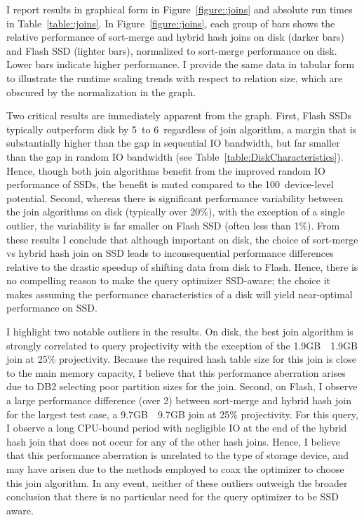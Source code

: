 I report results in graphical form in Figure~\ref{figure::joins} and absolute run times in Table~\ref{table::joins}.
In Figure~\ref{figure::joins}, each group of bars shows the relative performance of sort-merge and hybrid hash joins on disk (darker bars) and Flash SSD (lighter bars), normalized to sort-merge performance on disk.
Lower bars indicate higher performance.
I provide the same data in tabular form to illustrate the runtime scaling trends with respect to relation size, which are obscured by the normalization in the graph.

Two critical results are immediately apparent from the graph.  
First, Flash SSDs typically outperform disk by 5\texttimes~to 6\texttimes~regardless of join algorithm, a margin that is substantially higher than the gap in sequential IO bandwidth, but far smaller than the gap in random IO bandwidth (see Table~\ref{table:DiskCharacteristics}).
Hence, though both join algorithms benefit from the improved random IO performance of SSDs, the benefit is muted compared to the 100\texttimes~device-level potential.
Second, whereas there is significant performance variability between the join algorithms on disk (typically over 20\%), with the exception of a single outlier, the variability is far smaller on Flash SSD (often less than 1\%).
From these results I conclude that although important on disk, the choice of sort-merge vs hybrid hash join on SSD leads to inconsequential performance differences relative to the drastic speedup of shifting data from disk to Flash.
Hence, there is no compelling reason to make the query optimizer SSD-aware; the choice it makes assuming the performance characteristics of a disk will yield near-optimal performance on SSD.



I highlight two notable outliers in the results.
On disk, the best join algorithm is strongly correlated to query projectivity with the exception of the 1.9GB~\texttimes~1.9GB join at 25\% projectivity.
Because the required hash table size for this join is close to the main memory capacity, I believe that this performance aberration arises due to DB2 selecting poor partition sizes for the join.
Second, on Flash, I observe a large performance difference (over 2\texttimes) between sort-merge and hybrid hash join for the largest test case, a 9.7GB~\texttimes~9.7GB join at 25\% projectivity.
For this query, I observe a long CPU-bound period with negligible IO at the end of the hybrid hash join that does not occur for any of the other hash joins.
Hence, I believe that this performance aberration is unrelated to the type of storage device, and may have arisen due to the methods employed to coax the optimizer to choose this join algorithm.
In any event, neither of these outliers outweigh the broader conclusion that there is no particular need for the query optimizer to be SSD aware.

